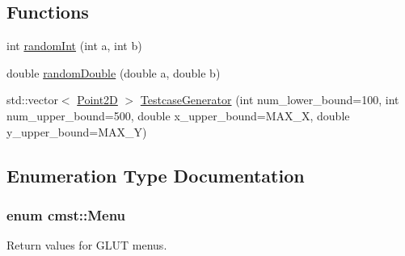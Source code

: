 \subsection*{Functions}
\begin{DoxyCompactItemize}
\item 
int \hyperlink{namespacecmst_a844037f018f3d5b7b1f1a5f4463da501}{random\+Int} (int a, int b)
\item 
double \hyperlink{namespacecmst_a8df08a5847caeb65a6606968e40f336f}{random\+Double} (double a, double b)
\item 
std\+::vector$<$ \hyperlink{classcmst_1_1_point2_d}{Point2D} $>$ \hyperlink{namespacecmst_abd1822f67dc5d2be959508e628be0633}{Testcase\+Generator} (int num\+\_\+lower\+\_\+bound=100, int num\+\_\+upper\+\_\+bound=500, double x\+\_\+upper\+\_\+bound=M\+A\+X\+\_\+X, double y\+\_\+upper\+\_\+bound=M\+A\+X\+\_\+Y)
\end{DoxyCompactItemize}


\subsection{Enumeration Type Documentation}
\subsubsection[{\texorpdfstring{Menu}{Menu}}]{\setlength{\rightskip}{0pt plus 5cm}enum {\bf cmst\+::\+Menu}}\hypertarget{namespacecmst_a8dff7ccfde8a2770160b5f8dbf81c3b9}{}\label{namespacecmst_a8dff7ccfde8a2770160b5f8dbf81c3b9}


Return values for G\+L\+UT menus. 

